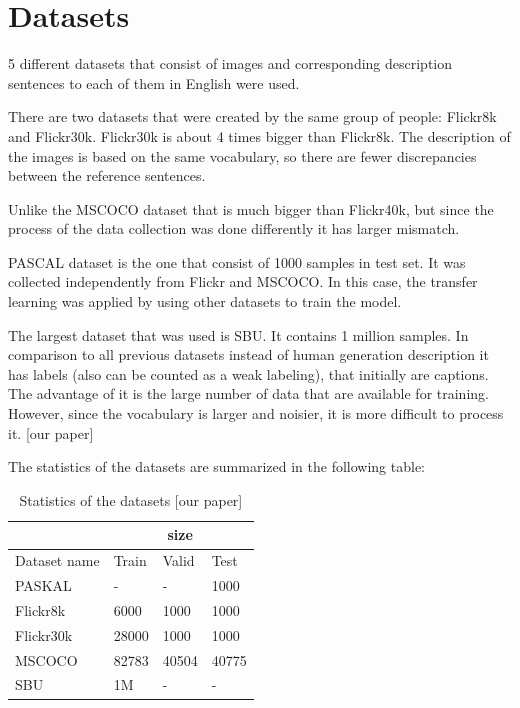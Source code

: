 \documentclass[a4paper,UKenglish,cleveref, autoref, thm-restate]{lipics-v2021}
\begin{document}
\section{Datasets}
\label{Datasets}
5 different datasets that consist of images and corresponding description sentences to each of them  in English were used.

There are two datasets that were created by the same group of people: Flickr8k and Flickr30k. Flickr30k is about 4 times bigger than Flickr8k. The description of the images is based on the same vocabulary, so there are fewer discrepancies between the reference sentences.

Unlike the MSCOCO dataset that is much bigger than Flickr40k, but since the process of the data collection was done differently it has larger mismatch.

PASCAL dataset is the one that consist of 1000 samples in test set. It was collected independently from Flickr and MSCOCO. In this case, the transfer learning was applied by using other datasets to train the model.

The largest dataset that was used is SBU. It contains 1 million samples. In comparison to all previous datasets instead of human generation description it has labels (also can be counted as a weak labeling), that initially are captions. The advantage of it is the large number of data that are available for training. However, since the vocabulary is larger and noisier, it is more difficult to process it. [our paper]

The statistics of the datasets are summarized in the following table:
\begin{table}
\centering
\begin{tabular}{ |p{3cm}||p{2cm}|p{2cm}|p{2cm}|  }
    \hline
    \centering
     & \multicolumn{3}{|c|}{size}\\
    \hline
     Dataset name & Train & Valid & Test \\
    \hline
     PASKAL   & - & - & 1000\\
     Flickr8k &  6000  & 1000 & 1000\\
     Flickr30k & 28000 & 1000 & 1000\\
     MSCOCO    & 82783 & 40504 & 40775\\
     SBU &   1M  & - & - \\
     \hline
\end{tabular}
\caption{Statistics of the datasets [our paper]}
\end {table}
\end{document}
